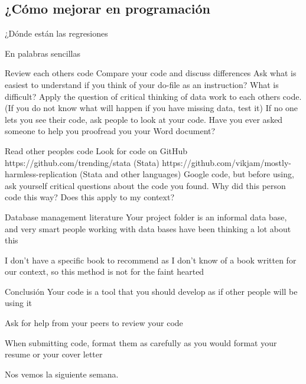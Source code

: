 \documentclass[11pt, aspectratio=169, compress]{beamer}
\makeatletter
\def\beamer@writeslidentry@miniframesoff{%
	\expandafter\beamer@ifempty\expandafter{\beamer@framestartpage}{}%
	{%
		\clearpage\beamer@notesactions%
	}
}
\newcommand*{\miniframesoff}{\let\beamer@writeslidentry=\beamer@writeslidentry@miniframesoff}
\makeatother
\begin{document}
\subsection{¿Cómo mejorar en programación}
\begin{frame}{¿Dónde están las regresiones}
	
\end{frame}
\begin{frame}{En palabras sencillas}
	
\end{frame}
\begin{frame}{Review each others code}
	Compare your code and discuss differences
	Ask what is easiest to understand if you think of your do-file as an instruction? What is difficult?
	Apply the question of critical thinking of data work to each others code. (If you do not know what will happen if you have missing data, test it)
	If no one lets you see their code, ask people to look at your code. Have you ever asked someone to help you proofread you your Word document?
\end{frame}
\begin{frame}{Read other peoples code}
	Look for code on GitHub 
	https://github.com/trending/stata (Stata)
	https://github.com/vikjam/mostly-harmless-replication (Stata and other languages)
	Google code, but before using, ask yourself critical questions about the code you found.
	Why did this person code this way?
	Does this apply to my context?		
\end{frame}
\begin{frame}{Database management literature}
	Your project folder is an informal data base, and very smart people working with data bases have been thinking a lot about this

	I don’t have a specific book to recommend as I don’t know of a book written for our context, so this method is not for the faint hearted		
\end{frame}
\begin{frame}{Conclusión}
	Your code is a tool that you should develop as if other people will be using it

	Ask for help from your peers to review your code
	
	When submitting code, format them as carefully as you would format your resume or your cover letter
\end{frame}
\miniframesoff 	
\begin{frame}
Nos vemos la siguiente semana. 
\end{frame}
\end{document}
